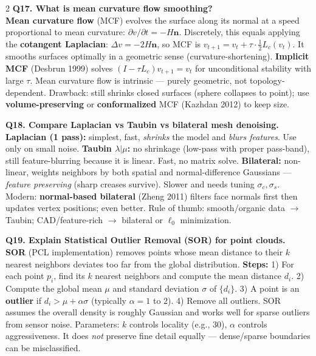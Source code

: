\begin{paracol}{2}
\textbf{Q17. What is mean curvature flow smoothing?}\\
\textbf{Mean curvature flow} (MCF) evolves the surface along its normal at a speed proportional to mean curvature: $\partial v/\partial t = -H\mathbf{n}$. Discretely, this equals applying the \textbf{cotangent Laplacian}: $\Delta v = -2H\mathbf{n}$, so MCF is $v_{t+1}=v_t+\tau\cdot \tfrac{1}{2}L_c(v_t)$. It smooths surfaces optimally in a geometric sense (curvature-shortening). \textbf{Implicit MCF} (Desbrun 1999) solves $(I-\tau L_c)v_{t+1}=v_t$ for unconditional stability with large $\tau$. Mean curvature flow is intrinsic — purely geometric, not topology-dependent. Drawback: still shrinks closed surfaces (sphere collapses to point); use \textbf{volume-preserving} or \textbf{conformalized} MCF (Kazhdan 2012) to keep size.

\textbf{Q18. Compare Laplacian vs Taubin vs bilateral mesh denoising.}\\
\textbf{Laplacian (1 pass):} simplest, fast, \textit{shrinks} the model and \textit{blurs features}. Use only on small noise. \textbf{Taubin $\lambda|\mu$:} no shrinkage (low-pass with proper pass-band), still feature-blurring because it is linear. Fast, no matrix solve. \textbf{Bilateral:} non-linear, weights neighbors by both spatial and normal-difference Gaussians — \textit{feature preserving} (sharp creases survive). Slower and needs tuning $\sigma_c, \sigma_s$. Modern: \textbf{normal-based bilateral} (Zheng 2011) filters face normals first then updates vertex positions; even better. Rule of thumb: smooth/organic data $\to$ Taubin; CAD/feature-rich $\to$ bilateral or $\ell_0$ minimization.

\textbf{Q19. Explain Statistical Outlier Removal (SOR) for point clouds.}\\
\textbf{SOR} (PCL implementation) removes points whose mean distance to their $k$ nearest neighbors deviates too far from the global distribution. \textbf{Steps:} 1) For each point $p_i$, find its $k$ nearest neighbors and compute the mean distance $d_i$. 2) Compute the global mean $\mu$ and standard deviation $\sigma$ of $\{d_i\}$. 3) A point is an \textbf{outlier} if $d_i > \mu + \alpha\sigma$ (typically $\alpha=1$ to $2$). 4) Remove all outliers. SOR assumes the overall density is roughly Gaussian and works well for sparse outliers from sensor noise. Parameters: $k$ controls locality (e.g., 30), $\alpha$ controls aggressiveness. It does \textit{not} preserve fine detail equally — dense/sparse boundaries can be misclassified.


\end{paracol}

